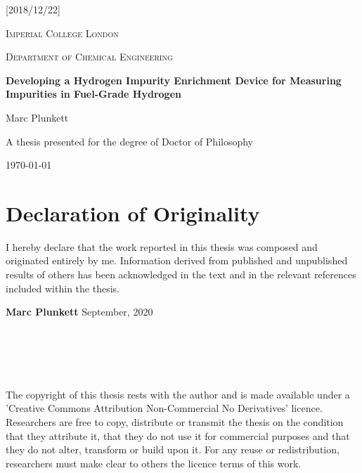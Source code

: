 \usepackage[T1]{fontenc}\usepackage{colorprofiles}\usepackage[a-2b,mathxmp]{pdfx}[2018/12/22]\hypersetup{pdfstartview=}
\usepackage{titlesec}

\doublespacing


\begin{titlepage}
 \centering
 {\scshape\Large Imperial College London \par}
 {\scshape\Large Department of Chemical Engineering\par}
 \vspace{1.5cm}
 {\LARGE\bfseries Developing a Hydrogen Impurity Enrichment Device for Measuring Impurities in Fuel-Grade Hydrogen\par}
 \vspace{2cm}
 {\Large Marc Plunkett\par}
 \vfill
 A thesis presented for the degree of Doctor of Philosophy\par

 \vfill

 {\large \today\par}
\end{titlepage}



\chapter*{Declaration of Originality}
I hereby declare that the work reported in this thesis was composed and originated entirely by me. Information derived from published and unpublished results of others has been acknowledged in the text and in the relevant references included within the thesis.

\noindent\newline
\textbf{Marc Plunkett}\newline
\noindent
September, 2020\newline
\noindent
\\
\\
\\
\\
\\
\\

The copyright of this thesis rests with the author and is made available under a 'Creative Commons Attribution Non-Commercial No Derivatives' licence. Researchers are free to copy, distribute or transmit the thesis on the condition that they attribute it, that they do not use it for commercial purposes and that they do not alter, transform or build upon it. For any reuse or redistribution, researchers must make clear to others the licence terms of this work.

